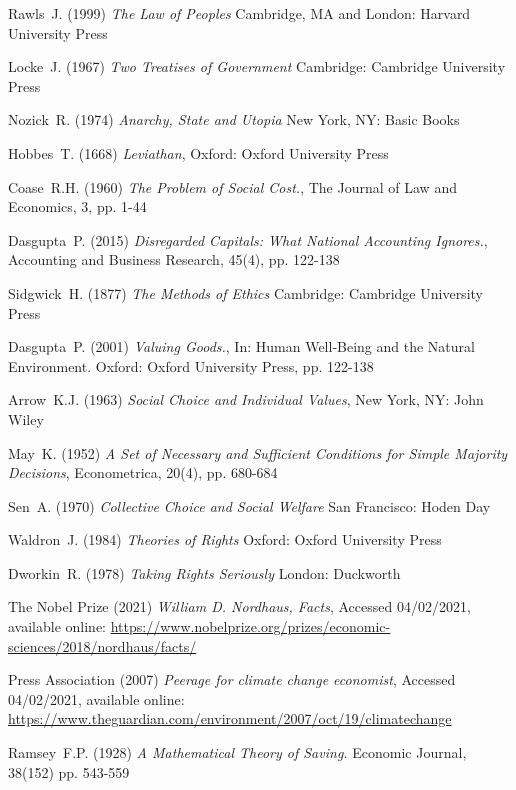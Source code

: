 \documentclass[12pt, oneside]{article}   	%
\begin{document}
\begin{thebibliography}{99}

 Rawls~J. (1999)
\emph{The Law of Peoples}
Cambridge, MA and London: Harvard University Press

 Locke~J. (1967)
\emph{Two Treatises of Government}
Cambridge: Cambridge University Press
	
 Nozick~R. (1974)
\emph{Anarchy, State and Utopia}
New York, NY: Basic Books
	
 Hobbes~T. (1668)
\emph{Leviathan},
Oxford: Oxford University Press

 Coase~R.H. (1960)
\emph{The Problem of Social Cost.},
The Journal of Law and Economics, 3, pp. 1-44

 Dasgupta~P. (2015)
\emph{Disregarded Capitals: What National Accounting Ignores.},
Accounting and Business Research, 45(4), pp. 122-138

 Sidgwick~H. (1877)
\emph{The Methods of Ethics}
Cambridge: Cambridge University Press

 Dasgupta~P. (2001)
\emph{Valuing Goods.},
In: Human Well-Being and the Natural Environment. Oxford: Oxford University Press, pp. 122-138

 Arrow~K.J. (1963)
\emph{Social Choice and Individual Values},
New York, NY: John Wiley
	
 May~K. (1952)
\emph{A Set of Necessary and Sufficient Conditions for Simple Majority Decisions},
Econometrica, 20(4), pp. 680-684

 Sen~A. (1970)
\emph{Collective Choice and Social Welfare}
San Francisco: Hoden Day

 Waldron~J. (1984)
\emph{Theories of Rights}
Oxford: Oxford University Press
		
 Dworkin~R. (1978)
\emph{Taking Rights Seriously}
London: Duckworth

 The Nobel Prize (2021)
\emph{William D. Nordhaus, Facts},
Accessed 04/02/2021, available online: 
\url{https://www.nobelprize.org/prizes/economic-sciences/2018/nordhaus/facts/}

 Press Association (2007)
\emph{Peerage for climate change economist},
Accessed 04/02/2021, available online: 
\url{https://www.theguardian.com/environment/2007/oct/19/climatechange}

 Ramsey~F.P. (1928)
\emph{A Mathematical Theory of Saving.}
Economic Journal, 38(152) pp. 543-559


\end{thebibliography}
\end{document}
